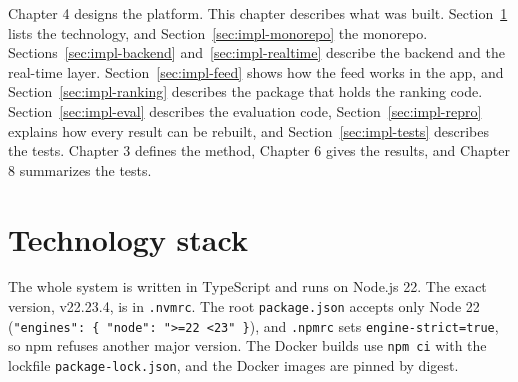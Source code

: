 \setlength{\emergencystretch}{3em}
\renewcommand{\topfraction}{0.9}
\renewcommand{\bottomfraction}{0.7}
\renewcommand{\textfraction}{0.1}
\renewcommand{\floatpagefraction}{0.8}

Chapter 4 designs the platform. This chapter describes what was built. Section~\ref{sec:impl-stack} lists the technology, and Section~\ref{sec:impl-monorepo} the monorepo. Sections~\ref{sec:impl-backend} and~\ref{sec:impl-realtime} describe the backend and the real-time layer. Section~\ref{sec:impl-feed} shows how the feed works in the app, and Section~\ref{sec:impl-ranking} describes the package that holds the ranking code. Section~\ref{sec:impl-eval} describes the evaluation code, Section~\ref{sec:impl-repro} explains how every result can be rebuilt, and Section~\ref{sec:impl-tests} describes the tests. Chapter 3 defines the method, Chapter 6 gives the results, and Chapter 8 summarizes the tests.

\section{Technology stack}
\label{sec:impl-stack}

The whole system is written in TypeScript and runs on Node.js 22. The exact version, v22.23.4, is in \texttt{.nvmrc}. The root \texttt{package.json} accepts only Node 22 (\texttt{"engines": \{ "node": ">=22 <23" \}}), and \texttt{.npmrc} sets \texttt{engine-strict=true}, so npm refuses another major version. The Docker builds use \texttt{npm ci} with the lockfile \texttt{package-lock.json}, and the Docker images are pinned by digest.


